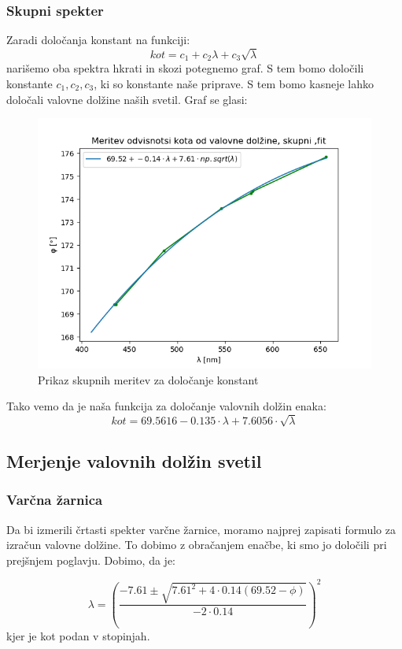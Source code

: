 \documentclass[11pt, a4paper]{article}
\theoremstyle{definition}
\theoremstyle{example}
\theoremstyle{izrek}
\begin{document}
\subsubsection{Skupni spekter}
Zaradi določanja konstant na funkciji:
$$kot=c_1+c_2\lambda+c_3 \sqrt{\lambda}$$
narišemo oba spektra hkrati in skozi potegnemo graf. S tem bomo določili konstante $c_1, c_2, c_3$, ki so konstante naše priprave. S tem bomo kasneje lahko določali valovne dolžine naših svetil.
Graf se glasi:
 \begin{figure}[H]
    \centering
    \includegraphics[width=12cm]{Skupni spekter,fit.png}
    \caption{Prikaz skupnih meritev za določanje konstant}
\end{figure}

Tako vemo da je naša funkcija za določanje valovnih dolžin enaka:
$$kot=69.5616-0.135 \cdot \lambda+7.6056\cdot \sqrt{\lambda}$$
\pagebreak
\subsection{Merjenje valovnih dolžin svetil}
\subsubsection{Varčna žarnica}
Da bi izmerili črtasti spekter varčne žarnice, moramo najprej zapisati formulo za izračun valovne dolžine. To dobimo z obračanjem enačbe, ki smo jo določili pri prejšnjem poglavju. Dobimo, da je:

$$\lambda=\left(\frac{-7.61 \pm\sqrt{7.61^2+4 \cdot 0.14(69.52-\phi)}}{-2 \cdot 0.14}\right)^2$$
kjer je kot podan v stopinjah.
\end{document}
